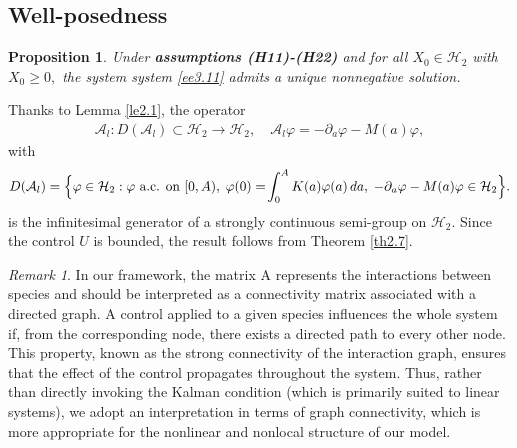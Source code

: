 \documentclass[10pt, a4paper]{amsart}
\makeatletter
\newcounter{assu}
\theoremstyle{plain}
\newtheorem{proposition}[lemma]{Proposition}
\theoremstyle{definition}
\theoremstyle{remark}
\newtheorem{remark}[lemma]{Remark}
\renewenvironment{proof}[1][\proofname]{\par
  \pushQED{\qed}%
  \normalfont \topsep6\p@\@plus6\p@\relax
  \trivlist
  \item[\hskip\labelsep
        \itshape
    #1\ \ref{#1}.]\ignorespaces
}{%
  \popQED\endtrivlist\@endpefalse
}
\numberwithin{equation}{section}
\makeatother
\begin{document}
\subsection*{\bf Well-posedness}
\begin{proposition}\label{p3.1}
Under {\bf assumptions (H11)-(H22)} and for all $X_0\in \mathcal{H}_2$ with $X_0\geq 0,$  the system  system \eqref{ee3.11} admits a unique nonnegative solution. 
\end{proposition}
\begin{proof}[of Proposition \ref{p3.1}]
Thanks to Lemma \ref{le2.1}, the operator
\begin{align}
 \mathcal A_l : D(\mathcal A_l)\subset\mathcal H_2\longrightarrow\mathcal H_2,
   \quad \mathcal A_l\varphi=-\partial_a\varphi - M(a)\varphi,
\end{align}
with
\begin{align}
D(\mathcal A_l)
= \Bigl\{\varphi\in\mathcal H_2 :
\varphi\text{ a.c. on }[0,A),\;
\varphi(0)=\!\int_0^AK(a)\varphi(a)\,da,\;
-\partial_a\varphi - M(a)\varphi\in\mathcal H_2
   \Bigr\}.
\end{align}
is the infinitesimal generator of a strongly continuous semi-group on $\mathcal{H}_2.$ Since the control $U$ is bounded, the result follows from Theorem \ref{th2.7}.
\end{proof}
\begin{remark}%
In our framework, the matrix A represents the interactions between species and should be interpreted as a connectivity matrix associated with a directed graph.
A control applied to a given species influences the whole system if, from the corresponding node, there exists a directed path to every other node.
This property, known as the strong connectivity of the interaction graph, ensures that the effect of the control propagates throughout the system.
Thus, rather than directly invoking the Kalman condition (which is primarily suited to linear systems), we adopt an interpretation in terms of graph connectivity, which is more appropriate for the nonlinear and nonlocal structure of our model.

\end{remark}
\end{document}
